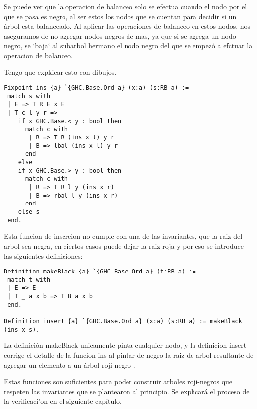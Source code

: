 \documentclass[letterpaper,12pt,oneside]{book}
\newcommand{\arn}{árbol roji-negro }
\newcommand{\arns}{arboles roji-negros }
\theoremstyle{plain}
\theoremstyle{definition}
\theoremstyle{remark}
\begin{document}
Se puede ver que la operacion de balanceo solo se efectua cuando el nodo por el que se pasa es negro, al ser estos los nodos que se cuentan para decidir si un \'arbol
esta balanceado. Al aplicar las operaciones de balanceo en estos nodos, nos aseguramos de no agregar nodos negros de mas, ya que si se agrega un nodo negro, se `baja` al subarbol hermano
el nodo negro del que se empez\'o a efctuar la operacion de balanceo. 

Tengo que expkicar esto con dibujos.
\begin{verbatim}
Fixpoint ins {a} `{GHC.Base.Ord a} (x:a) (s:RB a) :=
 match s with
 | E => T R E x E
 | T c l y r =>
    if x GHC.Base.< y : bool then 
      match c with
       | R => T R (ins x l) y r
       | B => lbal (ins x l) y r
      end
    else 
    if x GHC.Base.> y : bool then 
      match c with
       | R => T R l y (ins x r)
       | B => rbal l y (ins x r)
      end
    else s
 end.
\end{verbatim}

Esta funcion de insercion no cumple con una de las invariantes, que la raiz del arbol sea negra, en ciertos casos puede dejar la raiz roja y por eso se introduce las siguientes definiciones:

\begin{verbatim}
Definition makeBlack {a} `{GHC.Base.Ord a} (t:RB a) :=
 match t with
 | E => E
 | T _ a x b => T B a x b
 end.

Definition insert {a} `{GHC.Base.Ord a} (x:a) (s:RB a) := makeBlack (ins x s).
\end{verbatim}

La definici\'on makeBlack unicamente pinta cualquier nodo, y la definicion insert corrige el detalle de la funcion ins al pintar de negro la raiz de arbol resultante de 
agregar un elemento a un \arn.

Estas funciones son suficientes para poder construir \arns que respeten las invariantes que se plantearon al principio. Se explicar\'a el proceso de la verificaci'on en el siguiente cap\'itulo.
\end{document}
